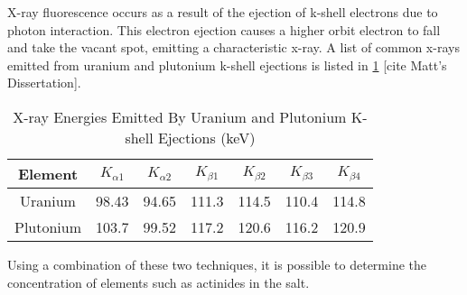 X-ray fluorescence occurs as a result of the ejection of k-shell electrons due to photon interaction. This electron ejection causes a higher orbit electron to fall and take the vacant spot, emitting a characteristic x-ray. A list of common x-rays emitted from uranium and plutonium k-shell ejections is listed in \ref{xrays-uranium-plutonium} [cite Matt's Dissertation]. \\

\begin{table}[hb]
\caption{X-ray Energies Emitted By Uranium and Plutonium K-shell Ejections (keV)}
\label{xrays-uranium-plutonium}
\begin{center}
\begin{tabular}[b]{|c|c|c|c|c|c|c|}
	\hline
	Element & $K_{\alpha1}$ & $K_{\alpha2}$ & $K_{\beta1}$ & $K_{\beta2}$ & $K_{\beta3}$ & $K_{\beta4}$\\ \hline
	Uranium & 98.43 & 94.65 & 111.3 & 114.5 & 110.4 & 114.8 \\ \hline
	Plutonium & 103.7 & 99.52 & 117.2 & 120.6 & 116.2 & 120.9\\ \hline

\end{tabular}
\end{center}
\end{table}

Using a combination of these two techniques, it is possible to determine the concentration of elements such as actinides in the salt. 



